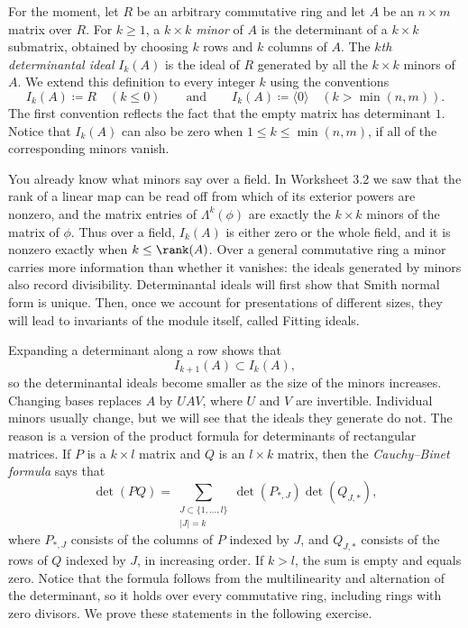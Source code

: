 \documentclass[12pt,reqno]{amsart}
\begin{document}
For the moment, let $R$ be an arbitrary commutative ring and let $A$ be an $n\times m$ matrix over $R$. For $k\geq1$, a \emph{$k\times k$ minor} of $A$ is the determinant of a $k\times k$ submatrix, obtained by choosing $k$ rows and $k$ columns of $A$. The \emph{$k$th determinantal ideal} $I_k(A)$ is the ideal of $R$ generated by all the $k\times k$ minors of $A$. We extend this definition to every integer $k$ using the conventions
\[
I_k(A)\coloneqq R\quad(k\leq0)\qquad\text{and}\qquad I_k(A)\coloneqq\langle0\rangle\quad(k>\min(n,m)).
\]
The first convention reflects the fact that the empty matrix has determinant $1$. Notice that $I_k(A)$ can also be zero when $1\leq k\leq\min(n,m)$, if all of the corresponding minors vanish.

You already know what minors say over a field. In Worksheet 3.2 we saw that the rank of a linear map can be read off from which of its exterior powers are nonzero, and the matrix entries of $\Lambda^k(\phi)$ are exactly the $k\times k$ minors of the matrix of $\phi$. Thus over a field, $I_k(A)$ is either zero or the whole field, and it is nonzero exactly when $k\leq\rank(A)$. Over a general commutative ring a minor carries more information than whether it vanishes: the ideals generated by minors also record divisibility. Determinantal ideals will first show that Smith normal form is unique. Then, once we account for presentations of different sizes, they will lead to invariants of the module itself, called Fitting ideals.

Expanding a determinant along a row shows that
\[
I_{k+1}(A)\subset I_k(A),
\]
so the determinantal ideals become smaller as the size of the minors increases. Changing bases replaces $A$ by $UAV$, where $U$ and $V$ are invertible. Individual minors usually change, but we will see that the ideals they generate do not. The reason is a version of the product formula for determinants of rectangular matrices. If $P$ is a $k\times l$ matrix and $Q$ is an $l\times k$ matrix, then the \emph{Cauchy--Binet formula} says that
\[
\det(PQ)=\sum_{\substack{J\subset\{1,\ldots,l\}\\|J|=k}}\det(P_{*,J})\det(Q_{J,*}),
\]
where $P_{*,J}$ consists of the columns of $P$ indexed by $J$, and $Q_{J,*}$ consists of the rows of $Q$ indexed by $J$, in increasing order. If $k>l$, the sum is empty and equals zero. Notice that the formula follows from the multilinearity and alternation of the determinant, so it holds over every commutative ring, including rings with zero divisors. We prove these statements in the following exercise.
\end{document}
